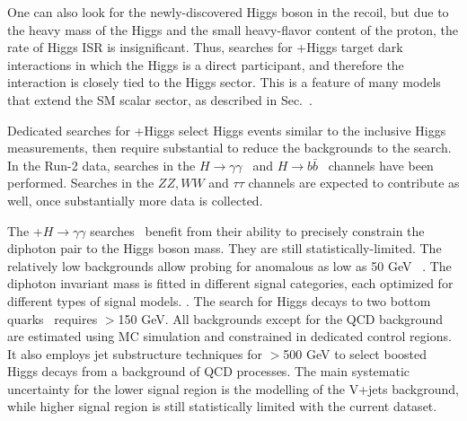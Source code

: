 %


One can also look for the newly-discovered Higgs boson in the recoil, but due to the heavy mass of the Higgs and the small heavy-flavor content of the proton, the rate of Higgs ISR is insignificant. 
Thus, searches for \MET+Higgs target dark interactions in which the Higgs is a direct participant, and therefore the interaction is closely tied to the Higgs sector. 
This is a feature of many models that extend the SM scalar sector, as described in Sec.~\cite{sec:BSMMediatorModels}. 

Dedicated searches for \MET+Higgs select Higgs events similar to the inclusive Higgs measurements, then require substantial \MET to reduce the backgrounds to the search.
In the Run-2 data, searches in the $H \rightarrow \gamma\gamma$~\cite{CMS-PAS-EXO-16-054,Aaboud:2017uak} and $H \rightarrow b\bar{b}$~\cite{Aaboud:2017yqz} channels have been performed.
Searches in the $ZZ, WW$ and $\tau\tau$ channels are expected to contribute as well, once substantially more data is collected. 

The \MET+$H \rightarrow \gamma\gamma$ searches~\cite{CMS-PAS-EXO-16-054,Aaboud:2017uak} benefit from their ability to precisely constrain the diphoton pair to the Higgs boson mass.
They are still statistically-limited.
The relatively low backgrounds allow probing for anomalous \MET as low as 50 GeV~\cite{CMS-PAS-EXO-16-054} .
The diphoton invariant mass is fitted in different signal categories, each optimized for different types of signal models. . 
The search for Higgs decays to two bottom quarks~\cite{Aaboud:2017yqz} requires \MET$>$150 GeV. All backgrounds except for the QCD background are estimated using MC simulation and constrained in dedicated control regions. 
It also employs jet substructure techniques for \MET$>$500 GeV to select boosted Higgs decays from a background of QCD processes.
The main systematic uncertainty for the lower \MET signal region is the modelling of the V+jets background, while higher \MET signal region is still statistically limited with the current dataset.

